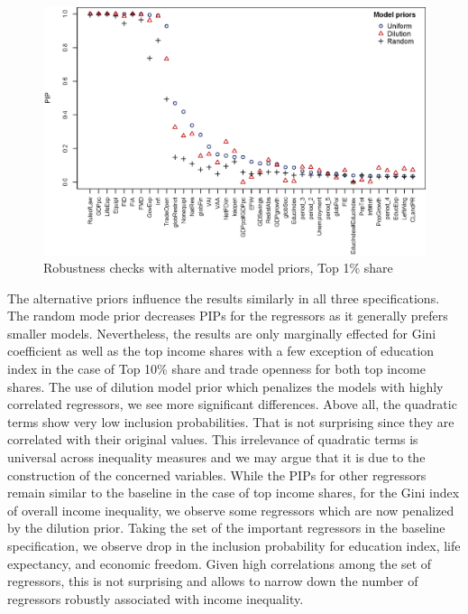 \documentclass[preprint, nonatbib, 10pt]{elsarticle}
\begin{document}
\begin{figure}[ht!]
  \centering
  \includegraphics[width=\textwidth, keepaspectratio]{figures/model_priors_comparison_top1}
  \caption{Robustness checks with alternative model priors, Top 1\% share}
  \label{ch4fig:top1_comp}
\end{figure}

The alternative priors influence the results similarly in all three specifications. The random mode prior decreases \acp{PIP} for the regressors as it generally prefers smaller models. Nevertheless, the results are only marginally effected for Gini coefficient as well as the top income shares with a few exception of education index in the case of Top 10\% share and trade openness for both top income shares. The use of dilution model prior which penalizes the models with highly correlated regressors, we see more significant differences. Above all, the quadratic terms show very low inclusion probabilities. That is not surprising since they are correlated with their original values. This irrelevance of quadratic terms is universal across inequality measures and we may argue that it is due to the construction of the concerned variables. While the \acp{PIP} for other regressors remain similar to the baseline in the case of top income shares, for the Gini index of overall income inequality, we observe some regressors which are now penalized by the dilution prior. Taking the set of the important regressors in the baseline specification, we observe drop in the inclusion probability for education index, life expectancy, and economic freedom. Given high correlations among the set of regressors, this is not surprising and allows to narrow down the number of regressors robustly associated with income inequality.
\end{document}
